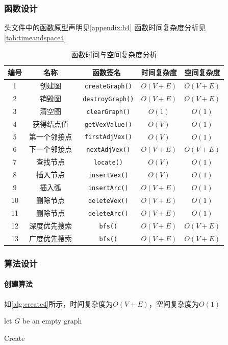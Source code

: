 \subsubsection{函数设计}
头文件中的函数原型声明见\autoref{appendix:h4}
函数时间复杂度分析见\autoref{tab:timeandspace4}
\begin{table}[ht]
\centering
\caption{函数时间与空间复杂度分析}
\label{tab:timeandspace4}
\begin{tabular}{@{}ccccc@{}}
\toprule
编号                          & 名称  & 函数签名 & 时间复杂度 & 空间复杂度 \\ \toprule
    \multicolumn{1}{c|}{1}  & 创建图 & \texttt{ createGraph()} & $O(V+E)$ &  $O(V+E)$ \\
    \multicolumn{1}{c|}{2}  & 销毁图& \texttt{ destroyGraph()} & $O(V+E)$ &  $O(V+E)$ \\
    \multicolumn{1}{c|}{3}  & 清空图& \texttt{ clearGraph()} & $O(1)$ &  $O(1)$   \\
    \multicolumn{1}{c|}{4}  & 获得结点值& \texttt{ getVexValue()} & $O(V)$ &  $O(1)$     \\
    \multicolumn{1}{c|}{5}  & 第一个邻接点& \texttt{ firstAdjVex()} & $O(V)$ &  $O(1)$     \\
    \multicolumn{1}{c|}{6}  & 下一个邻接点& \texttt{ nextAdjVex()} & $O(V+E)$ &  $O(V+E)$      \\
    \multicolumn{1}{c|}{7}  & 查找节点 & \texttt{ locate()} & $O(V)$ &  $O(1)$   \\
    \multicolumn{1}{c|}{8}  & 插入节点 & \texttt{ insertVex()} & $O(V)$ &  $O(1)$    \\
    \multicolumn{1}{c|}{9}  & 插入弧 & \texttt{ insertArc()} & $O(V+E)$ &  $O(1)$     \\
    \multicolumn{1}{c|}{10}  & 删除节点 & \texttt{ deleteVex()} & $O(V+E)$ &  $O(1)$  \\
    \multicolumn{1}{c|}{11}  & 删除节点 & \texttt{ deleteArc()} & $O(V+E)$ &  $O(1)$  \\
    \multicolumn{1}{c|}{12}  & 深度优先搜索& \texttt{ bfs()}   & $O(V+E)$ & $O(V+E)$ \\
    \multicolumn{1}{c|}{13}  & 广度优先搜索& \texttt{ bfs()}   & $O(V+E)$ & $O(V+E)$ \\ \bottomrule
\end{tabular}
\end{table}
\subsubsection{算法设计}
\paragraph{创建算法}如\autoref{alg:create4}所示，时间复杂度为$O(V+E)$，空间复杂度为$O(1)$
\par
\begin{algorithm}[H]
    \SetAlgoLined
    let $G$ be an empty graph\;
    \caption{Create}\label{alg:create4}
\end{algorithm}
